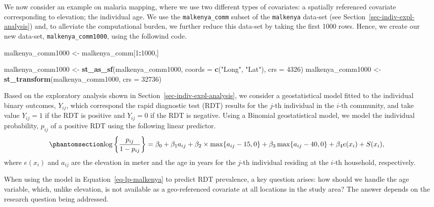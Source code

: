 \documentclass[
  letterpaper,
]{krantz}
\newenvironment{Shaded}{\begin{snugshade}}{\end{snugshade}}
\newcommand{\AttributeTok}[1]{\textcolor[rgb]{0.13,0.29,0.53}{#1}}
\newcommand{\DecValTok}[1]{\textcolor[rgb]{0.00,0.00,0.81}{#1}}
\newcommand{\FunctionTok}[1]{\textcolor[rgb]{0.13,0.29,0.53}{\textbf{#1}}}
\newcommand{\NormalTok}[1]{#1}
\newcommand{\OtherTok}[1]{\textcolor[rgb]{0.56,0.35,0.01}{#1}}
\newcommand{\SpecialCharTok}[1]{\textcolor[rgb]{0.81,0.36,0.00}{\textbf{#1}}}
\newcommand{\StringTok}[1]{\textcolor[rgb]{0.31,0.60,0.02}{#1}}
\begin{document}
We now consider an example on malaria mapping, where we use two
different types of covariates: a spatially referenced covariate
corresponding to elevation; the individual age. We use the
\texttt{malkenya\_comm} subset of the \texttt{malkenya} data-set (see
Section~\ref{sec-indiv-expl-analysis}) and, to alleviate the
computational burden, we further reduce this data-set by taking the
first 1000 rows. Hence, we create our new data-set,
\texttt{malkenya\_comm1000}, using the followind code.

\begin{Shaded}
\begin{Highlighting}[]
\NormalTok{malkenya\_comm1000 }\OtherTok{\textless{}{-}}\NormalTok{ malkenya\_comm[}\DecValTok{1}\SpecialCharTok{:}\DecValTok{1000}\NormalTok{,]}

\NormalTok{malkenya\_comm1000 }\OtherTok{\textless{}{-}} \FunctionTok{st\_as\_sf}\NormalTok{(malkenya\_comm1000, }\AttributeTok{coords =} \FunctionTok{c}\NormalTok{(}\StringTok{"Long"}\NormalTok{, }\StringTok{"Lat"}\NormalTok{),}
                              \AttributeTok{crs =} \DecValTok{4326}\NormalTok{)}
\NormalTok{malkenya\_comm1000 }\OtherTok{\textless{}{-}} \FunctionTok{st\_transform}\NormalTok{(malkenya\_comm1000, }\AttributeTok{crs =} \DecValTok{32736}\NormalTok{)}
\end{Highlighting}
\end{Shaded}

Based on the exploratory analysis shown in
Section~\ref{sec-indiv-expl-analysis}, we consider a geostatistical
model fitted to the individual binary outcomes, \(Y_{ij}\), which
correspond the rapid diagnostic test (RDT) results for the \(j\)-th
individual in the \(i\)-th community, and take value \(Y_{ij}=1\) if the
RDT is positive and \(Y_{ij}=0\) if the RDT is negative. Using a
Binomial geostatistical model, we model the individual probability,
\(p_{ij}\) of a positive RDT using the following linear predictor.
\begin{equation}\phantomsection\label{eq-lp-malkenya}{
\log\left\{\frac{p_{ij}}{1-p_{ij}}\right\} = \beta_{0} + \beta_{1}a_{ij}+\beta_{2} \times\max\{a_{ij}-15, 0\} + \beta_{3}\max\{a_{ij}-40, 0\} + \beta_{4} e(x_i) + S(x_i),
}\end{equation} where \(e(x_{i})\) and \(a_{ij}\) are the elevation in
meter and the age in years for the \(j\)-th individual residing at the
\(i\)-th household, respectively.

When using the model in Equation~\ref{eq-lp-malkenya} to predict RDT
prevalence, a key question arises: how should we handle the age
variable, which, unlike elevation, is not available as a geo-referenced
covariate at all locations in the study area? The answer depends on the
research question being addressed.
\end{document}
